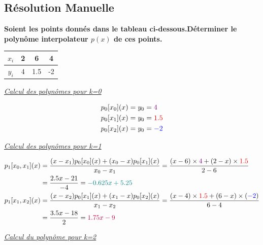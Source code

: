 \documentclass{report}
\begin{document}
\subsection{Résolution Manuelle}
\begin{center}
    \textbf{Soient les points donnés dans le tableau ci-dessous.Déterminer le polynôme interpolateur $p(x)$ de ces points.}\vspace{6pt}\\
\begin{tabular}{|c|c|c|c|}
    \hline
    $x_i$ & 2 & 6 & 4 \\
    \hline
    $y_i$ & 4 & 1.5 & -2\\
    \hline
\end{tabular}
\end{center}
\underline{\textit{Calcul des polynômes pour k=0}}\\
\begin{center}
    \begin{align*}
        p_0[x_0](x)&=y_0=\textcolor{violet}{4}\vspace{4pt}\\
        p_0[x_1](x)&=y_0=\textcolor{red}{1.5}\vspace{4pt}\\
        p_0[x_2](x)&=y_0=\textcolor{blue}{-2}\vspace{4pt}\\
    \end{align*}
\end{center}
\underline{\textit{Calcul des polynômes pour k=1}}\\
\begin{center}
    \begin{align*}
        p_1[x_0, x_1](x)&=\frac{(x-x_1)p_0[x_0](x)+(x_0-x)p_0[x_1](x)}{x_0-x_1}=\frac{(x-6)\times\textcolor{violet}{4}+(2-x)\times\textcolor{red}{1.5}}{2-6}\\&=\frac{2.5x-21}{-4}=\textcolor{teal}{-0.625x+5.25}\vspace{4pt}\\
        p_1[x_1, x_2](x)&=\frac{(x-x_2)p_0[x_1](x)+(x_1-x)p_0[x_2](x)}{x_1-x_2}=\frac{(x-4)\times \textcolor{red}{1.5}+(6-x)\times(\textcolor{blue}{-2})}{6-4}\\&=\frac{3.5x-18}{2}=\textcolor{purple}{1.75x-9}\vspace{4pt}\\
    \end{align*}
\end{center}
\underline{\textit{Calcul du polynôme pour k=2}}\\
\end{document}
